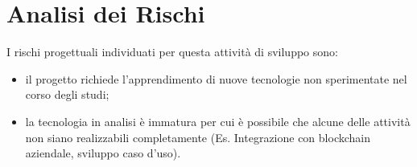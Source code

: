 \section*{Analisi dei Rischi}
I rischi progettuali individuati per questa attività di sviluppo sono:
\begin{itemize}
\item il progetto richiede l'apprendimento di nuove tecnologie non sperimentate nel corso degli studi;
\item la tecnologia in analisi è immatura per cui è possibile che alcune delle attività non siano realizzabili completamente (Es. Integrazione con blockchain aziendale, sviluppo caso d'uso). 
\end{itemize}